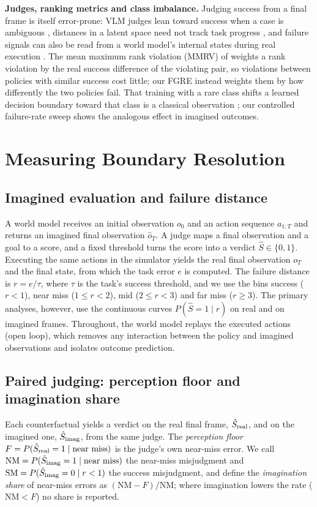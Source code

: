 \documentclass[10pt]{article}
\begin{document}
\textbf{Judges, ranking metrics and class imbalance.} Judging success from a final frame is itself error-prone: VLM judges lean toward success when a case is ambiguous \citep{navasardyan2026failbench}, distances in a latent space need not track task progress \citep{moukheiber2026tempo}, and failure signals can also be read from a world model's internal states during real execution \citep{pei2026farm}. The mean maximum rank violation (MMRV) of \citet{li2024simpler} weights a rank violation by the real success difference of the violating pair, so violations between policies with similar success cost little; our FGRE instead weights them by how differently the two policies fail. That training with a rare class shifts a learned decision boundary toward that class is a classical observation \citep{cao2019ldam}; our controlled failure-rate sweep shows the analogous effect in imagined outcomes.

\section{Measuring Boundary Resolution}
\label{sec:method}

\subsection{Imagined evaluation and failure distance}
A world model receives an initial observation $o_0$ and an action sequence $a_{1:T}$ and returns an imagined final observation $\hat o_T$. A judge maps a final observation and a goal to a score, and a fixed threshold turns the score into a verdict $\hat S\in\{0,1\}$. Executing the same actions in the simulator yields the real final observation $o_T$ and the final state, from which the task error $e$ is computed. The failure distance is $r=e/\tau$, where $\tau$ is the task's success threshold, and we use the bins success ($r<1$), near miss ($1\le r<2$), mid ($2\le r<3$) and far miss ($r\ge3$). The primary analyses, however, use the continuous curves $P(\hat S=1\mid r)$ on real and on imagined frames. Throughout, the world model replays the executed actions (open loop), which removes any interaction between the policy and imagined observations and isolates outcome prediction.

\subsection{Paired judging: perception floor and imagination share}
Each counterfactual yields a verdict on the real final frame, $\hat S_{\rm real}$, and on the imagined one, $\hat S_{\rm imag}$, from the same judge. The \emph{perception floor} $F=P(\hat S_{\rm real}=1\mid\text{near miss})$ is the judge's own near-miss error. We call $\mathrm{NM}=P(\hat S_{\rm imag}=1\mid\text{near miss})$ the near-miss misjudgment and $\mathrm{SM}=P(\hat S_{\rm imag}=0\mid r<1)$ the success misjudgment, and define the \emph{imagination share} of near-miss errors as $(\mathrm{NM}-F)/\mathrm{NM}$; where imagination lowers the rate ($\mathrm{NM}<F$) no share is reported.
\end{document}
